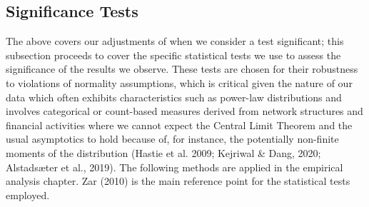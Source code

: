 \subsection{Significance Tests}
\label{subsec:significance_testing}

The above covers our adjustments of when we consider a test significant; this subsection proceeds to cover the specific statistical tests we use to assess the significance of the results we observe. These tests are chosen for their robustness to violations of normality assumptions, which is critical given the nature of our data which often exhibits characteristics such as power-law distributions and involves categorical or count-based measures derived from network structures and financial activities where we cannot expect the Central Limit Theorem and the usual asymptotics to hold because of, for instance, the potentially non-finite moments of the distribution (Hastie et al. 2009; Kejriwal \& Dang, 2020; Alstadsæter et al., 2019). The following methods are applied in the empirical analysis chapter. Zar (2010) is the main reference point for the statistical tests employed.
